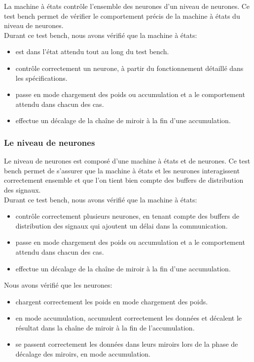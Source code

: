 La machine à états contrôle l'ensemble des neurones d'un niveau de neurones.
Ce test bench permet de vérifier le comportement précis de la machine
à états du niveau de neurones.\\

Durant ce test bench, nous avons vérifié que la machine à états:
\begin{itemize}
	\item est dans l'état attendu tout au long du test bench.
	\item contrôle correctement un neurone, à partir du fonctionnement
	détaillé dans les spécifications.
	\item passe en mode chargement des poids ou accumulation et a le
	comportement attendu dans chacun des cas.
	\item effectue un décalage de la chaîne de miroir à la fin d'une
	accumulation.
\end{itemize}

\subsubsection{Le niveau de neurones}

Le niveau de neurones est composé d'une machine à états et de neurones.
Ce test bench permet de s'assurer que la machine à états et les neurones
interagissent correctement ensemble et que l'on tient bien compte des buffers
de distribution des signaux.\\

Durant ce test bench, nous avons vérifié que la machine à états:
\begin{itemize}
	\item contrôle correctement plusieurs neurones, en tenant
	compte des buffers de distribution des signaux qui ajoutent un
	délai dans la communication.
	\item passe en mode chargement des poids ou accumulation et a le
	comportement attendu dans chacun des cas.
	\item effectue un décalage de la chaîne de miroir à la fin d'une
	accumulation.
\end{itemize}

Nous avons vérifié que les neurones:
\begin{itemize}
	\item chargent correctement les poids en mode chargement des poids.
	\item en mode accumulation, accumulent correctement les données et
	décalent le résultat dans la chaîne de miroir à la fin de
	l'accumulation.
	\item se passent correctement les données dans leurs miroirs lors
	de la phase de décalage des miroirs, en mode accumulation.
\end{itemize}

